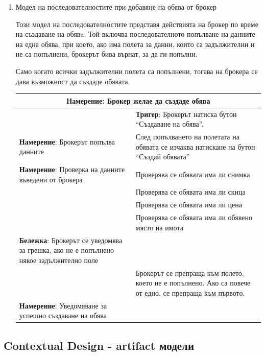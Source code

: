 \documentclass[]{article}
\begin{document}
\begin{enumerate}[I.]
{	
	} %
	
	\item {Модел на последователностите при добавяне на обява от брокер

Този модел на последователностите представя действията на брокер по време на създаване на обявa. Той включва последователното попълване на данните на една обява, при което, ако има полета за данни, които са задължителни и не са попълнени, брокерът бива върнат, за да ги попълни.

Само когато всички задължителни полета са попълнени, тогава на брокера се дава възможност да създаде обявата.

\begin{center}
  \begin{tabular}{ |p{5cm}|p{10cm}| }
    \hline
    \multicolumn{2}{|c|}{\textbf{Намерение}: Брокер желае да създаде обява} \\
    \hline
    	& \textbf{Тригер}: Брокерът натиска бутон ``Създаване на обява''. \\
    \hline
    	\textbf{Намерение}: Брокерът попълва данните & След попълването на полетата на обявата се изчаква натискане на бутон ``Създай обявата''  \\  
	\hline
    	\textbf{Намерение}: Проверка на данните въведени от брокера & Проверява се обявата има ли снимка \\
    \hline
    	& Проверява се обявата има ли скица \\
    \hline
    	& Проверява се обявата има ли цена \\
    \hline
    	& Проверява се обявата има ли обявено място на имота \\
    \hline
        \textbf{Бележка}: Брокерът се уведомява за грешка, ако не е попълнено някое задължително поле & \\
    \hline     
    	& Брокерът се препраща към полето, което не е попълнено. Ако са повече от едно, се препраща към първото. \\
    \hline
    	\textbf{Намерение}: Уведомяване за успешно създаване на обява & \\
    \hline
  \end{tabular}
\end{center}
	
	} %
	
\end{enumerate}

\subsection*{Contextual Design - artifact модели}
\end{document}
